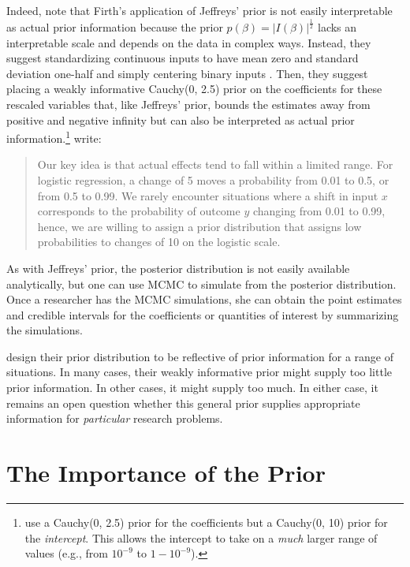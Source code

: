 \documentclass[12pt]{article}
\begin{document}
Indeed, \cite{Gelmanetal2008} note that Firth's application of Jeffreys' prior is not easily interpretable as actual prior information because the prior $p(\beta) = |I(\beta)|^\frac{1}{2}$ lacks an interpretable scale and depends on the data in complex ways. 
Instead, they suggest standardizing continuous inputs to have mean zero and standard deviation one-half and simply centering binary inputs \citep{Gelman2008}. 
Then, they suggest placing a weakly informative Cauchy(0, 2.5) prior on the coefficients for these rescaled variables that, like Jeffreys' prior, bounds the estimates away from positive and negative infinity but can also be interpreted as actual prior information.\footnote{
\cite{Gelmanetal2008} use a Cauchy(0, 2.5) prior for the coefficients but a Cauchy(0, 10) prior for the \emph{intercept}. 
This allows the intercept to take on a \emph{much} larger range of values (e.g., from $10^{-9}$ to $1 - 10^{-9}$).} 
\citet[p. 1363]{Gelmanetal2008} write:
\begin{quote}
Our key idea is that actual effects tend to fall within a limited range. For logistic regression, a change of 5 moves a probability from 0.01 to 0.5, or from 0.5 to 0.99. We rarely encounter situations where a shift in input $x$ corresponds to the probability of outcome $y$ changing from 0.01 to 0.99, hence, we are willing to assign a prior distribution that assigns low probabilities to changes of 10 on the logistic scale.
\end{quote}

As with Jeffreys' prior, the posterior distribution is not easily available analytically, but one can use MCMC to simulate from the posterior distribution. 
Once a researcher has the MCMC simulations, she can obtain the point estimates and credible intervals for the coefficients or quantities of interest by summarizing the simulations. 

\cite{Gelmanetal2008} design their prior distribution to be reflective of prior information for a range of situations. 
In many cases, their weakly informative prior might supply too little prior information. 
In other cases, it might supply too much. 
In either case, it remains an open question whether this general prior supplies appropriate information for \emph{particular} research problems.

\section*{The Importance of the Prior}
\end{document}
